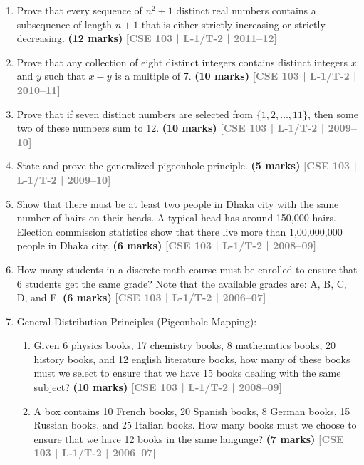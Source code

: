 \documentclass[12pt,a3paper]{article}
\newcommand{\yr}[1]{\hfill\textcolor{gray}{\small\textbf{[#1]}}}
\newcommand{\mk}[1]{\textcolor{orange!70!black}{\small\textbf{(#1 marks)}}}
\begin{document}
\begin{enumerate}
\item Prove that every sequence of $n^2 + 1$ distinct real numbers contains a subsequence of length $n + 1$ that is either strictly increasing or strictly decreasing.
\mk{12} \yr{CSE 103 | L-1/T-2 | 2011--12}

\item Prove that any collection of eight distinct integers contains distinct integers $x$ and $y$ such that $x - y$ is a multiple of 7.
\mk{10} \yr{CSE 103 | L-1/T-2 | 2010--11}

\item Prove that if seven distinct numbers are selected from $\{1,2, \dots, 11\}$, then some two of these numbers sum to 12.
\mk{10} \yr{CSE 103 | L-1/T-2 | 2009--10}

\item State and prove the generalized pigeonhole principle.
\mk{5} \yr{CSE 103 | L-1/T-2 | 2009--10}

\item Show that there must be at least two people in Dhaka city with the same number of hairs on their heads. A typical head has around 150,000 hairs. Election commission statistics show that there live more than 1,00,000,000 people in Dhaka city.
\mk{6} \yr{CSE 103 | L-1/T-2 | 2008--09}

\item How many students in a discrete math course must be enrolled to ensure that 6 students get the same grade? Note that the available grades are: A, B, C, D, and F.
\mk{6} \yr{CSE 103 | L-1/T-2 | 2006--07}

\item General Distribution Principles (Pigeonhole Mapping):
\begin{enumerate}
  \item Given 6 physics books, 17 chemistry books, 8 mathematics books, 20 history books, and 12 english literature books, how many of these books must we select to ensure that we have 15 books dealing with the same subject? \mk{10} \yr{CSE 103 | L-1/T-2 | 2008--09}
  \item A box contains 10 French books, 20 Spanish books, 8 German books, 15 Russian books, and 25 Italian books. How many books must we choose to ensure that we have 12 books in the same language? \mk{7} \yr{CSE 103 | L-1/T-2 | 2006--07}
\end{enumerate}


\end{enumerate}
\end{document}

